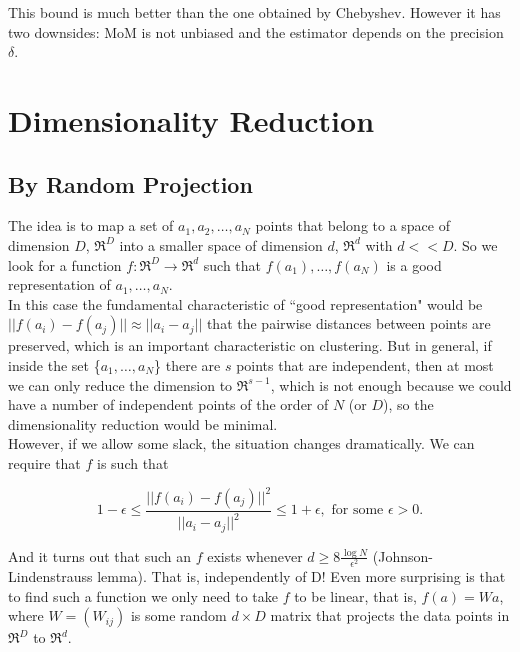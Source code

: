 \documentclass[11pt, english]{article}
\begin{document}
This bound is much better than the one obtained by Chebyshev. However it has two downsides: MoM is not unbiased and the estimator depends on the precision $\delta$.


\section{Dimensionality Reduction}

\subsection{By Random Projection}
The idea is to map a set of $a_1,a_2,\dots,a_N$ points that belong to a space of dimension $D$, $\Re^D$ into a smaller space of dimension $d$, $\Re^d$ with $d<<D$. So we look for a function $f:\Re^D\rightarrow\Re^d$ such that $f(a_1),\dots,f(a_N)$ is a good representation of $a_1,\dots,a_N$. \\

In this case the fundamental characteristic of ``good representation" would be $||f(a_i) - f(a_j)|| \approx ||a_i - a_j||$ that the pairwise distances between points are preserved, which is an important characteristic on clustering. But in general, if inside the set \{$a_1,\dots,a_N$\} there are $s$ points that are independent, then at most we can only reduce the dimension to $\Re^{s-1}$, which is not enough because we could have a number of independent points of the order of $N$ (or $D$), so the dimensionality reduction would be minimal.\\

However, if we allow some slack, the situation changes dramatically. We can require that $f$ is such that

\begin{equation}
	1-\epsilon\leq\frac{||f(a_i)-f(a_j)||^2}{||a_i-a_j||^2}\leq 1+\epsilon, \text{ for some }\epsilon>0. 
\end{equation}

And it turns out that such an $f$ exists whenever $d\geq 8\frac{\log N}{\epsilon^2}$ (Johnson-Lindenstrauss lemma). That is, independently of D! Even more surprising is that to find such a function we only need to take $f$ to be linear, that is, $f(a) = Wa$, where $W=(W_{ij})$ is some random $d\times D$ matrix that projects the data points in $\Re^D$ to $\Re^d$.
\end{document}

